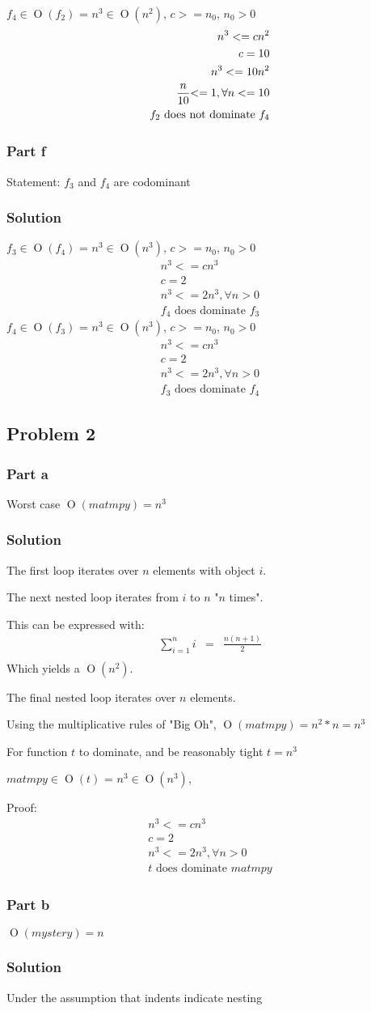 \documentclass[10pt,letterpaper,oneside]{article}
\newcommand{\Problem}[1]{\subsection*{Problem #1}}
\newcommand{\Part}[1]{\subsubsection*{Part #1}}
\newcommand{\Solution}{\subsubsection*{Solution}}
\DeclareMathOperator{\Omicron}{O}
\newcommand{\BigOh}[1]{\Omicron(#1)}
\begin{document}
		$f_4 \in \BigOh{f_2}$ = $n^3\in \BigOh{n^2}$,	
		$c >= n_0$,
		$ n_0 > 0$
		\begin{eqnarray*}
			\text{$n^3<= cn^2$}\\
			\text{$c=10$}\\
			\text{$n^3 <= 10n^2$}\\
			\frac{n}{10}\text{$ <= 1$}, \forall n <= 10\\
			\text{$f_2$ does not dominate $f_4$}
		\end{eqnarray*}
	\Part{f}
	Statement: $f_3$ and $f_4$ are codominant
	\Solution
		$f_3 \in \BigOh{f_4}$ = $n^3 \in \BigOh{n^3}$,	
		$c >= n_0$,
		$ n_0 > 0$
		\begin{eqnarray*}
			\text{$n^3 <= cn^3$}\\
			\text{$c=2$}\\
			\text{$n^3 <= 2n^3$}, \forall n>0\\
			\text{$f_4$ does dominate $f_3$}
		\end{eqnarray*}
		$f_4 \in \BigOh{f_3}$ = $n^3 \in \BigOh{n^3}$,	
		$c >= n_0$,
		$ n_0 > 0$
		\begin{eqnarray*}
			\text{$n^3 <= cn^3$}\\
			\text{$c=2$}\\
			\text{$n^3 <= 2n^3$}, \forall n>0\\
			\text{$f_3$ does dominate $f_4$}
		\end{eqnarray*}
\Problem{2}
	\Part{a}
		Worst case
		$\BigOh{matmpy} = n^3$
		\Solution
			The first loop iterates over $n$ elements with object $i$. 

			The next nested loop iterates from $i$ to $n$ "$n$ times".

			 This can be expressed with:
			\begin{eqnarray}
				\sum_{i=1}^n i  & = & \frac{n(n+1)}{2} \\
			\end{eqnarray} 
			Which yields a $\BigOh{n^2}$. 

			The final nested loop iterates over $n$ elements.

			 Using the multiplicative rules of "Big Oh", $\BigOh{matmpy} = n^2 * n = n^3$

			 For function $t$ to dominate, and be reasonably tight $t=n^3$

			$matmpy \in \BigOh{t}$ = $n^3 \in \BigOh{n^3}$,	
			
			Proof:
				\begin{eqnarray*}
					\text{$n^3 <= cn^3$}\\
					\text{$c=2$}\\
					\text{$n^3 <= 2n^3$}, \forall n>0\\
					\text{$t$ does dominate $matmpy$}
				\end{eqnarray*}
	\Part{b}
		$\BigOh{mystery} = n$	
		\Solution
			Under the assumption that indents indicate nesting 
\end{document}
